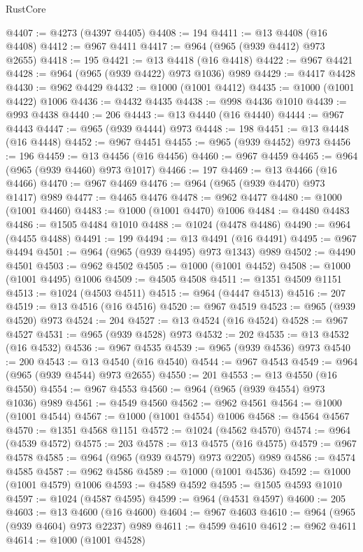\begin{lexlean}{RustCore}
\begin{coremodule}
@4407 := @4273 (@4397 @4405)
@4408 := 194
@4411 := @13 @4408 (@16 @4408)
@4412 := @967 @4411
@4417 := @964 (@965 (@939 @4412) @973 @2655)
@4418 := 195
@4421 := @13 @4418 (@16 @4418)
@4422 := @967 @4421
@4428 := @964 (@965 (@939 @4422) @973 @1036) @989
@4429 := @4417 @4428
@4430 := @962 @4429
@4432 := @1000 (@1001 @4412)
@4435 := @1000 (@1001 @4422) @1006
@4436 := @4432 @4435
@4438 := @998 @4436 @1010
@4439 := @993 @4438
@4440 := 206
@4443 := @13 @4440 (@16 @4440)
@4444 := @967 @4443
@4447 := @965 (@939 @4444) @973
@4448 := 198
@4451 := @13 @4448 (@16 @4448)
@4452 := @967 @4451
@4455 := @965 (@939 @4452) @973
@4456 := 196
@4459 := @13 @4456 (@16 @4456)
@4460 := @967 @4459
@4465 := @964 (@965 (@939 @4460) @973 @1017)
@4466 := 197
@4469 := @13 @4466 (@16 @4466)
@4470 := @967 @4469
@4476 := @964 (@965 (@939 @4470) @973 @1417) @989
@4477 := @4465 @4476
@4478 := @962 @4477
@4480 := @1000 (@1001 @4460)
@4483 := @1000 (@1001 @4470) @1006
@4484 := @4480 @4483
@4486 := @1505 @4484 @1010
@4488 := @1024 (@4478 @4486)
@4490 := @964 (@4455 @4488)
@4491 := 199
@4494 := @13 @4491 (@16 @4491)
@4495 := @967 @4494
@4501 := @964 (@965 (@939 @4495) @973 @1343) @989
@4502 := @4490 @4501
@4503 := @962 @4502
@4505 := @1000 (@1001 @4452)
@4508 := @1000 (@1001 @4495) @1006
@4509 := @4505 @4508
@4511 := @1351 @4509 @1151
@4513 := @1024 (@4503 @4511)
@4515 := @964 (@4447 @4513)
@4516 := 207
@4519 := @13 @4516 (@16 @4516)
@4520 := @967 @4519
@4523 := @965 (@939 @4520) @973
@4524 := 204
@4527 := @13 @4524 (@16 @4524)
@4528 := @967 @4527
@4531 := @965 (@939 @4528) @973
@4532 := 202
@4535 := @13 @4532 (@16 @4532)
@4536 := @967 @4535
@4539 := @965 (@939 @4536) @973
@4540 := 200
@4543 := @13 @4540 (@16 @4540)
@4544 := @967 @4543
@4549 := @964 (@965 (@939 @4544) @973 @2655)
@4550 := 201
@4553 := @13 @4550 (@16 @4550)
@4554 := @967 @4553
@4560 := @964 (@965 (@939 @4554) @973 @1036) @989
@4561 := @4549 @4560
@4562 := @962 @4561
@4564 := @1000 (@1001 @4544)
@4567 := @1000 (@1001 @4554) @1006
@4568 := @4564 @4567
@4570 := @1351 @4568 @1151
@4572 := @1024 (@4562 @4570)
@4574 := @964 (@4539 @4572)
@4575 := 203
@4578 := @13 @4575 (@16 @4575)
@4579 := @967 @4578
@4585 := @964 (@965 (@939 @4579) @973 @2205) @989
@4586 := @4574 @4585
@4587 := @962 @4586
@4589 := @1000 (@1001 @4536)
@4592 := @1000 (@1001 @4579) @1006
@4593 := @4589 @4592
@4595 := @1505 @4593 @1010
@4597 := @1024 (@4587 @4595)
@4599 := @964 (@4531 @4597)
@4600 := 205
@4603 := @13 @4600 (@16 @4600)
@4604 := @967 @4603
@4610 := @964 (@965 (@939 @4604) @973 @2237) @989
@4611 := @4599 @4610
@4612 := @962 @4611
@4614 := @1000 (@1001 @4528)

\end{coremodule}
\end{lexlean}
